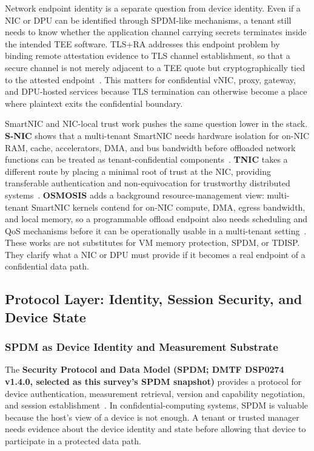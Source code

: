 Network endpoint identity is a separate question from device identity. Even if
a NIC or DPU can be identified through SPDM-like mechanisms, a tenant still
needs to know whether the application channel carrying secrets terminates
inside the intended TEE software. TLS+RA addresses this endpoint problem by
binding remote attestation evidence to TLS channel establishment, so that a
secure channel is not merely adjacent to a TEE quote but cryptographically tied
to the attested endpoint~\cite{weinhold2025tlsra}. This matters for
confidential vNIC, proxy, gateway, and DPU-hosted services because TLS
termination can otherwise become a place where plaintext exits the confidential
boundary.

SmartNIC and NIC-local trust work pushes the same question lower in the stack.
\textbf{S-NIC} shows that a multi-tenant SmartNIC needs hardware isolation for
on-NIC RAM, cache, accelerators, DMA, and bus bandwidth before offloaded network
functions can be treated as tenant-confidential components~\cite{zhou2024snic}.
\textbf{TNIC} takes a different route by placing a minimal root of trust at the
NIC, providing transferable authentication and non-equivocation for trustworthy
distributed systems~\cite{giantsidi2025tnic}. \textbf{OSMOSIS} adds a
background resource-management view: multi-tenant SmartNIC kernels contend for
on-NIC compute, DMA, egress bandwidth, and local memory, so a programmable
offload endpoint also needs scheduling and QoS mechanisms before it can be
operationally usable in a multi-tenant setting~\cite{khalilov2024osmosis}.
These works are not substitutes for VM memory protection, SPDM, or TDISP. They
clarify what a NIC or DPU must provide if it becomes a real endpoint of a
confidential data path.

\subsection{Protocol Layer: Identity, Session Security, and Device State}

\subsubsection{SPDM as Device Identity and Measurement Substrate}

The \textbf{Security Protocol and Data Model (SPDM; DMTF DSP0274 v1.4.0,
selected as this survey's SPDM snapshot)} provides a protocol for device authentication,
measurement retrieval, version and capability negotiation, and session
establishment~\cite{dmtf_spdm_2025,dmtf_spdm_arch_2024}.
In confidential-computing systems, SPDM is valuable because the host's view of a
device is not enough. A tenant or trusted manager needs evidence about the
device identity and state before allowing that device to participate in a
protected data path.

